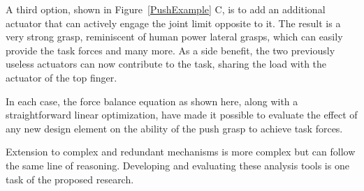 A third option, shown in Figure~\ref{PushExample} C, is to add an additional actuator that can actively engage the joint limit opposite to it.   The result is a very strong grasp, reminiscent of human power lateral grasps, which can easily provide the task forces and many more.   As a side benefit, the two previously useless actuators can now contribute to the task, sharing the load with the actuator of the top finger.

In each case, the force balance equation as shown here, along with a straightforward linear optimization, have made it possible to evaluate the effect of any new design element on the ability of the push grasp to achieve task forces.

Extension to complex and redundant mechanisms is more complex but can follow the same line of reasoning.   Developing and evaluating these analysis tools is one task of the proposed research.
